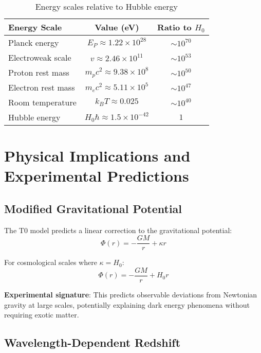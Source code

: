 \documentclass[12pt,a4paper]{article}
\newcommand{\Hzero}{H_0}
\newcommand{\kappaparam}{\kappa}
\begin{document}
	\begin{table}[htbp]
		\centering
		\begin{tabular}{lcc}
			\toprule
			\textbf{Energy Scale} & \textbf{Value (eV)} & \textbf{Ratio to $H_0$} \\
			\midrule
			Planck energy & $E_P \approx 1.22 \times 10^{28}$ & $\sim 10^{70}$ \\
			Electroweak scale & $v \approx 2.46 \times 10^{11}$ & $\sim 10^{53}$ \\
			Proton rest mass & $m_p c^2 \approx 9.38 \times 10^8$ & $\sim 10^{50}$ \\
			Electron rest mass & $m_e c^2 \approx 5.11 \times 10^5$ & $\sim 10^{47}$ \\
			Room temperature & $k_B T \approx 0.025$ & $\sim 10^{40}$ \\
			Hubble energy & $H_0 \hbar \approx 1.5 \times 10^{-42}$ & $1$ \\
			\bottomrule
		\end{tabular}
		\caption{Energy scales relative to Hubble energy}
		\label{tab:energy_scales}
	\end{table}
	
	\section{Physical Implications and Experimental Predictions}
	\label{sec:physical_implications}
	
	\subsection{Modified Gravitational Potential}
	\label{subsec:modified_gravity}
	
	The T0 model predicts a linear correction to the gravitational potential:
	\begin{equation}
		\Phi(r) = -\frac{GM}{r} + \kappaparam r
	\end{equation}
	
	For cosmological scales where $\kappaparam = \Hzero$:
	\begin{equation}
		\Phi(r) = -\frac{GM}{r} + \Hzero r
		\label{eq:cosmological_potential}
	\end{equation}
	
	\textbf{Experimental signature}: This predicts observable deviations from Newtonian gravity at large scales, potentially explaining dark energy phenomena without requiring exotic matter.
	
	\subsection{Wavelength-Dependent Redshift}
	\label{subsec:wavelength_redshift}
	
\end{document}

